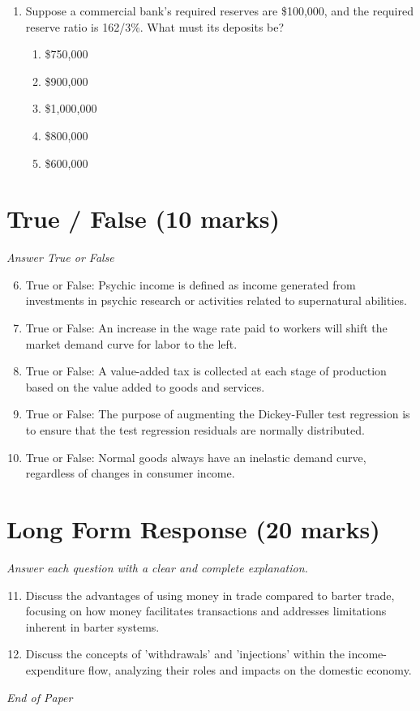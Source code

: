 \documentclass[12pt]{article}
\begin{document}
\begin{enumerate}[label=\arabic*.]
\begin{enumerate}[label=(\alph*)]
    \item the average wage is higher.
    \item the national debt is lower.
    \item production is higher.
    \item prices are higher.
    \item employment is higher.
\end{enumerate}
\item Suppose a commercial bank's required reserves are \$100,000, and the required reserve ratio is 162/3\%. What must its deposits be?
\begin{enumerate}[label=(\alph*)]
    \item \$750,000
    \item \$900,000
    \item \$1,000,000
    \item \$800,000
    \item \$600,000
\end{enumerate}
\end{enumerate}

\section*{True / False (10 marks)}
\textit{Answer True or False}
\begin{enumerate}[label=\arabic*.]
\setcounter{enumi}{5}
\item True or False: Psychic income is defined as income generated from investments in psychic research or activities related to supernatural abilities.
\item True or False: An increase in the wage rate paid to workers will shift the market demand curve for labor to the left.
\item True or False: A value-added tax is collected at each stage of production based on the value added to goods and services.
\item True or False: The purpose of augmenting the Dickey-Fuller test regression is to ensure that the test regression residuals are normally distributed.
\item True or False: Normal goods always have an inelastic demand curve, regardless of changes in consumer income.
\end{enumerate}

\section*{Long Form Response (20 marks)}
\textit{Answer each question with a clear and complete explanation.}
\begin{enumerate}[label=\arabic*.]
\setcounter{enumi}{10}
\item Discuss the advantages of using money in trade compared to barter trade, focusing on how money facilitates transactions and addresses limitations inherent in barter systems.
\item Discuss the concepts of 'withdrawals' and 'injections' within the income-expenditure flow, analyzing their roles and impacts on the domestic economy.
\end{enumerate}

\vfill
\noindent\textit{End of Paper}
\end{document}
